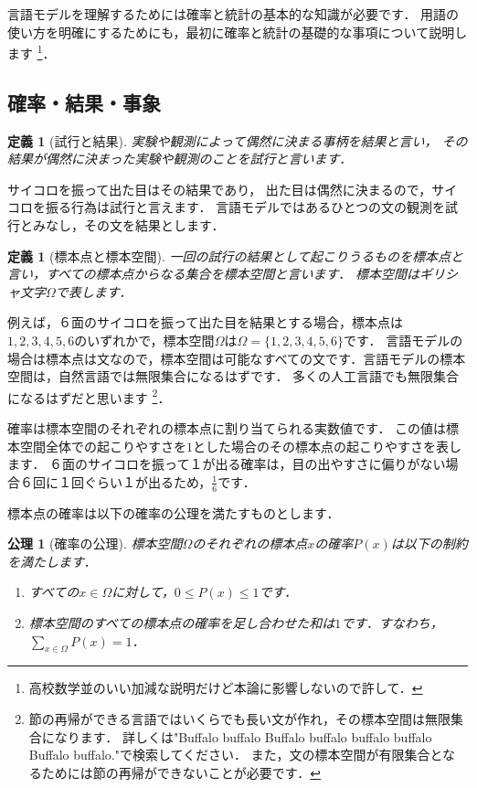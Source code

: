 \documentclass[11pt]{report}
\newtheorem{definition}[theorem]{定義}
\newtheorem{axiom}[theorem]{公理}
\begin{document}
言語モデルを理解するためには確率と統計の基本的な知識が必要です．
用語の使い方を明確にするためにも，最初に確率と統計の基礎的な事項について説明します
\footnote{高校数学並のいい加減な説明だけど本論に影響しないので許して．}．

\subsection{確率・結果・事象}

\begin{definition}[試行と結果]
	実験や観測によって偶然に決まる事柄を結果と言い，
	その結果が偶然に決まった実験や観測のことを試行と言います．
\end{definition}

サイコロを振って出た目はその結果であり，
出た目は偶然に決まるので，サイコロを振る行為は試行と言えます．
言語モデルではあるひとつの文の観測を試行とみなし，その文を結果とします．

\begin{definition}[標本点と標本空間]
	一回の試行の結果として起こりうるものを標本点と言い，すべての標本点からなる集合を標本空間と言います．
	標本空間はギリシャ文字$\Omega$で表します．
\end{definition}

例えば，６面のサイコロを振って出た目を結果とする場合，標本点は$1,2,3,4,5,6$のいずれかで，標本空間$\Omega$は$\Omega = \{1,2,3,4,5,6\}$です．
言語モデルの場合は標本点は文なので，標本空間は可能なすべての文です．言語モデルの標本空間は，自然言語では無限集合になるはずです．
多くの人工言語でも無限集合になるはずだと思います
\footnote{節の再帰ができる言語ではいくらでも長い文が作れ，その標本空間は無限集合になります．
詳しくは"Buffalo buffalo Buffalo buffalo buffalo buffalo Buffalo buffalo."で検索してください．
また，文の標本空間が有限集合となるためには節の再帰ができないことが必要です．}．

確率は標本空間のそれぞれの標本点に割り当てられる実数値です．
この値は標本空間全体での起こりやすさを$1$とした場合のその標本点の起こりやすさを表します．
６面のサイコロを振って１が出る確率は，目の出やすさに偏りがない場合６回に１回ぐらい１が出るため，$\frac{1}{6}$です．

標本点の確率は以下の確率の公理を満たすものとします．

\begin{axiom}[確率の公理]
	標本空間$\Omega$のそれぞれの標本点$x$の確率$P(x)$は以下の制約を満たします．
	\begin{enumerate}
		\item すべての$x \in \Omega$に対して，$0 \leq P(x) \leq 1$です．
		\item 標本空間のすべての標本点の確率を足し合わせた和は$1$です．すなわち，$\displaystyle \sum_{x \in \Omega} P(x) = 1$．
	\end{enumerate}
\end{axiom}
\end{document}
